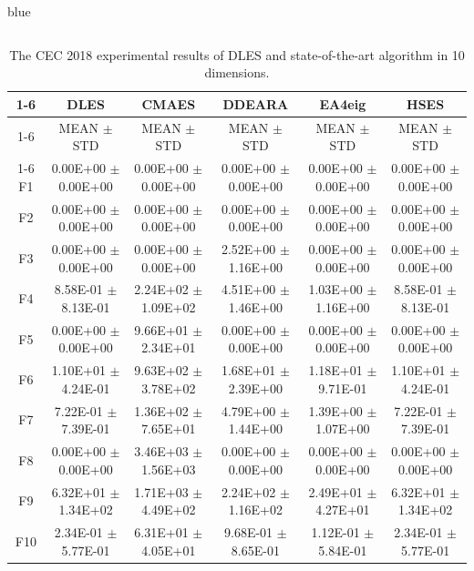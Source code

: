 \documentclass[journal, onecolumn]{IEEEtran}
\begin{document}
\begin{color}{blue}
\begin{table}[htbp!]
\begin{tabular}{c|ccccc}
		\end{tabular}
	\end{table}
\begin{table}[htbp!]
\centering
\caption{The CEC 2018 experimental results of DLES and state-of-the-art algorithm in 10 dimensions.}
\label{CEC2018_10}
	\begin{tabular}{c|ccccc}
		\cline{1-6}
				 &	DLES			 &	CMAES				 &	DDEARA				 &	EA4eig				 &	HSES			\\	\cline{1-6}	
			&	MEAN	$\pm$	STD	 &	MEAN	$\pm$	STD		 &	MEAN	$\pm$	STD		 &	MEAN	$\pm$	STD		 &	MEAN	$\pm$	STD	\\	\cline{1-6}	
			F1	 &	0.00E+00	$\pm$	0.00E+00	 &	0.00E+00	$\pm$	0.00E+00		 &	0.00E+00	$\pm$	0.00E+00		 &	0.00E+00	$\pm$	0.00E+00		 &	0.00E+00	$\pm$	0.00E+00	\\		
			F2	 &	0.00E+00	$\pm$	0.00E+00	 &	0.00E+00	$\pm$	0.00E+00		 &	0.00E+00	$\pm$	0.00E+00		 &	0.00E+00	$\pm$	0.00E+00		 &	0.00E+00	$\pm$	0.00E+00	\\		
			F3	 &	0.00E+00	$\pm$	0.00E+00	 &	0.00E+00	$\pm$	0.00E+00		 &	2.52E+00	$\pm$	1.16E+00		 &	0.00E+00	$\pm$	0.00E+00		 &	0.00E+00	$\pm$	0.00E+00	\\		
			F4	 &	8.58E-01	$\pm$	8.13E-01	 &	2.24E+02	$\pm$	1.09E+02		 &	4.51E+00	$\pm$	1.46E+00		 &	1.03E+00	$\pm$	1.16E+00		 &	8.58E-01	$\pm$	8.13E-01	\\		
			F5	 &	0.00E+00	$\pm$	0.00E+00	 &	9.66E+01	$\pm$	2.34E+01		 &	0.00E+00	$\pm$	0.00E+00		 &	0.00E+00	$\pm$	0.00E+00		 &	0.00E+00	$\pm$	0.00E+00	\\		
			F6	 &	1.10E+01	$\pm$	4.24E-01	 &	9.63E+02	$\pm$	3.78E+02		 &	1.68E+01	$\pm$	2.39E+00		 &	1.18E+01	$\pm$	9.71E-01		 &	1.10E+01	$\pm$	4.24E-01	\\		
			F7	 &	7.22E-01	$\pm$	7.39E-01	 &	1.36E+02	$\pm$	7.65E+01		 &	4.79E+00	$\pm$	1.44E+00		 &	1.39E+00	$\pm$	1.07E+00		 &	7.22E-01	$\pm$	7.39E-01	\\		
			F8	 &	0.00E+00	$\pm$	0.00E+00	 &	3.46E+03	$\pm$	1.56E+03		 &	0.00E+00	$\pm$	0.00E+00		 &	0.00E+00	$\pm$	0.00E+00		 &	0.00E+00	$\pm$	0.00E+00	\\		
			F9	 &	6.32E+01	$\pm$	1.34E+02	 &	1.71E+03	$\pm$	4.49E+02		 &	2.24E+02	$\pm$	1.16E+02		 &	2.49E+01	$\pm$	4.27E+01		 &	6.32E+01	$\pm$	1.34E+02	\\		
			F10	 &	2.34E-01	$\pm$	5.77E-01	 &	6.31E+01	$\pm$	4.05E+01		 &	9.68E-01	$\pm$	8.65E-01		 &	1.12E-01	$\pm$	5.84E-01		 &	2.34E-01	$\pm$	5.77E-01	\\		

\end{tabular}
\end{table}
\end{color}
\end{document}
